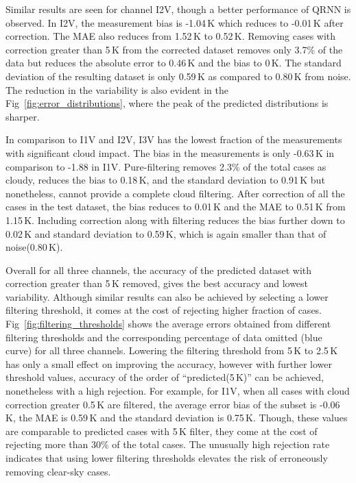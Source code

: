 \documentclass[amt, manuscript]{copernicus}
\begin{document}
Similar results are seen for channel I2V, though a better performance of QRNN is observed. In I2V, the measurement bias is -1.04\,K which reduces to -0.01\,K after correction. The MAE also reduces from 1.52\,K to 0.52\,K. Removing cases with correction greater than 5\,K from the corrected dataset removes only 3.7\% of the data but reduces the absolute error to 0.46\,K and the bias to 0\,K. The standard deviation of the resulting dataset is only 0.59\,K as compared to 0.80\,K from noise. The reduction in the variability is also evident in the Fig~\ref{fig:error_distributions}, where the peak of the predicted distributions is sharper.

In comparison to I1V and I2V, I3V has the lowest fraction of the measurements with significant cloud impact. The bias in the measurements is only -0.63\,K in comparison to -1.88 in I1V. Pure-filtering removes 2.3\% of the total cases as cloudy, reduces the bias to 0.18\,K, and the standard deviation to 0.91\,K but nonetheless, cannot provide a complete cloud filtering. After correction of all the cases in the test dataset, the bias reduces to 0.01\,K and the MAE to 0.51\,K from 1.15\,K. Including correction along with filtering reduces the bias further down to 0.02\,K and standard deviation to 0.59\,K, which is again smaller than that of noise(0.80\,K).

Overall for all three channels, the accuracy of the predicted dataset with correction greater than 5\,K removed, gives the best accuracy and lowest variability. Although similar results can also be achieved by selecting a lower filtering threshold, it comes at the cost of rejecting higher fraction of cases. Fig~\ref{fig:filtering_thresholds} shows the average errors obtained from different filtering thresholds and the corresponding percentage of data omitted (blue curve) for all three channels. Lowering the filtering threshold from 5\,K to 2.5\,K has only a small effect on improving the accuracy, however with further lower threshold values, accuracy of the order of ``predicted(5\,K)'' can be achieved, nonetheless with a high rejection. For example, for I1V, when all cases with cloud correction greater 0.5\,K are filtered, the average error bias of the subset is -0.06\,K, the MAE is 0.59\,K and the standard deviation is 0.75\,K. Though, these values are comparable to predicted cases with 5\,K filter, they come at the cost of rejecting more than 30\% of the total cases. The unusually high rejection rate indicates that using lower filtering thresholds elevates the risk of erroneously removing clear-sky cases.  
\end{document}
